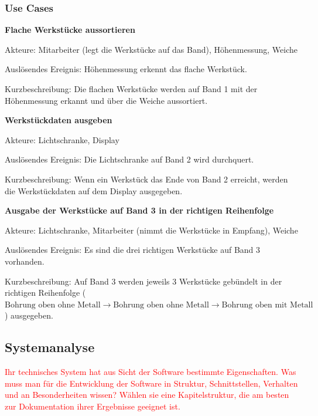\documentclass[a4paper, 11pt]{article}
\begin{document}
\newpage

\subsubsection{Use Cases}

\begin{compactenum}[1.]
\item \textbf{Flache Werkstücke aussortieren}
\medskip

Akteure: Mitarbeiter (legt die Werkstücke auf das Band), Höhenmessung, Weiche
\medskip

Auslösendes Ereignis: Höhenmessung erkennt das flache Werkstück.
\medskip

Kurzbeschreibung: Die flachen Werkstücke werden auf Band 1 mit der Höhenmessung erkannt und über die Weiche aussortiert.
\bigskip

\item \textbf{Werkstückdaten ausgeben}
\medskip

Akteure: Lichtschranke, Display
\medskip

Auslösendes Ereignis: Die Lichtschranke auf Band 2 wird durchquert.
\medskip

Kurzbeschreibung: Wenn ein Werkstück das Ende von Band 2 erreicht, werden die Werkstückdaten auf dem Display ausgegeben.
\bigskip

\item \textbf{Ausgabe der Werkstücke auf Band 3 in der richtigen Reihenfolge}
\medskip

Akteure: Lichtschranke, Mitarbeiter (nimmt die Werkstücke in Empfang), Weiche
\medskip

Auslösendes Ereignis: Es sind die drei richtigen Werkstücke auf Band 3 vorhanden.
\medskip

Kurzbeschreibung: Auf Band 3 werden jeweils 3 Werkstücke gebündelt in der richtigen Reihenfolge ($\text{Bohrung oben ohne Metall}\rightarrow \text{Bohrung oben ohne Metall}\rightarrow \text{Bohrung oben mit Metall}$) ausgegeben.
\end{compactenum}

\subsection{Systemanalyse}
\textcolor{red}{Ihr technisches System hat aus Sicht der Software bestimmte Eigenschaften. Was muss man für die Entwicklung der Software in Struktur, Schnittstellen, Verhalten und an Besonderheiten wissen? Wählen sie eine Kapitelstruktur, die am besten zur Dokumentation ihrer Ergebnisse geeignet ist.}
\end{document}
